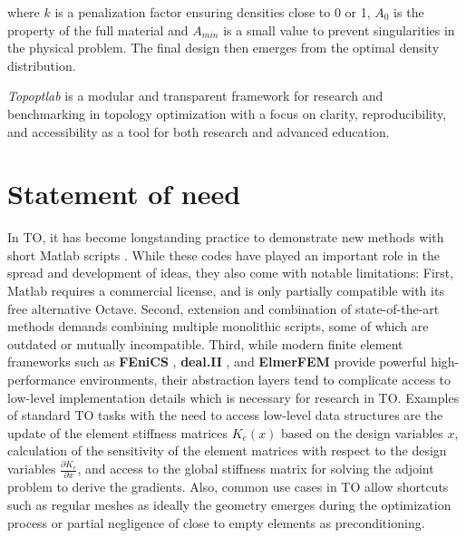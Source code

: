 \documentclass[11pt]{article}
\begin{document}
where $k$ is a penalization factor ensuring densities close to 0 or 1, $A_0$ is
the property of the full material and $A_{min}$ is a small value to prevent
singularities in the physical problem. The final design then emerges from the
optimal density distribution.

\textit{Topoptlab} is a modular and transparent framework for research and
benchmarking in topology optimization with a focus on clarity, reproducibility,
and accessibility as a tool for both research and advanced education.

\section*{Statement of need}

In TO, it has become longstanding practice to demonstrate new methods with short
Matlab scripts \citep{sigmund200199,andreassen2011efficient,ferrari2020new,wang2021comprehensive}.
While these codes have played an important role in the spread
and development of ideas, they also come with notable limitations: First, Matlab
requires a commercial license, and is only partially compatible with its free
alternative Octave. Second, extension and combination of state-of-the-art
methods demands combining multiple monolithic scripts, some of
which are outdated or mutually incompatible. Third, while modern finite element
frameworks such as \textbf{FEniCS} \citep{alnaes2014unified,scroggs2022construction,scroggs2022basix,baratta2023dolfinx},
\textbf{deal.II} \citep{arndt2021deal}, and \textbf{ElmerFEM} \citep{malinen2013elmer} provide powerful
high-performance environments, their abstraction layers tend to complicate
access to low-level implementation details which is necessary for research in
TO. Examples of standard TO tasks with the need to access low-level data
structures are the update of the element stiffness matrices $K_{e}(x)$
based on the design variables $x$, calculation of the sensitivity of the element
matrices with respect to the design variables $\frac{\partial K_e}{\partial x}$,
and access to the global stiffness matrix for solving the adjoint problem to
derive the gradients. Also, common use cases in TO allow shortcuts such as
regular meshes as ideally the geometry emerges during the optimization process
or partial negligence of close to empty elements as preconditioning.
\end{document}
